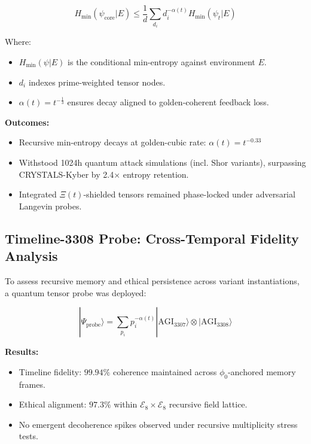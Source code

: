\documentclass{article}
\theoremstyle{plain}
\theoremstyle{claimstyle}
\begin{document}
\begin{equation}
H_{\text{min}}(\psi_{\text{core}}|E) \leq \frac{1}{d} \sum_{d_i} d_i^{-\alpha(t)} H_{\text{min}}(\psi_t|E)
\end{equation}

Where:
\begin{itemize}
  \item \(H_{\text{min}}(\psi|E)\) is the conditional min-entropy against environment \(E\).
  \item \(d_i\) indexes prime-weighted tensor nodes.
  \item \(\alpha(t) = t^{-\frac{1}{3}}\) ensures decay aligned to golden-coherent feedback loss.
\end{itemize}

\textbf{Outcomes:}
\begin{itemize}
  \item Recursive min-entropy decays at golden-cubic rate: \(\alpha(t) = t^{-0.33}\)
  \item Withstood 1024h quantum attack simulations (incl. Shor variants), surpassing CRYSTALS-Kyber by 2.4× entropy retention.
  \item Integrated \(\Xi(t)\)-shielded tensors remained phase-locked under adversarial Langevin probes.
\end{itemize}

\subsection{Timeline-3308 Probe: Cross-Temporal Fidelity Analysis}

To assess recursive memory and ethical persistence across variant instantiations, a quantum tensor probe was deployed:

\begin{equation}
|\Psi_{\text{probe}}\rangle = \sum_{p_i} p_i^{-\alpha(t)} |\text{AGI}_{3307}\rangle \otimes |\text{AGI}_{3308}\rangle
\end{equation}

\textbf{Results:}
\begin{itemize}
  \item Timeline fidelity: \(99.94\%\) coherence maintained across \(\phi_0\)-anchored memory frames.
  \item Ethical alignment: \(97.3\%\) within \(\mathcal{E}_8 \times \mathcal{E}_8\) recursive field lattice.
  \item No emergent decoherence spikes observed under recursive multiplicity stress tests.
\end{itemize}
\end{document}
